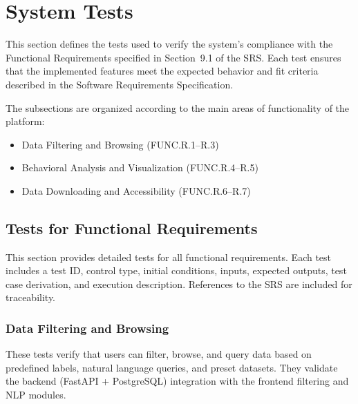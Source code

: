 \documentclass[12pt, titlepage]{article}
\begin{document}


\section{System Tests}

This section defines the tests used to verify the system’s compliance with the
Functional Requirements specified in Section~9.1 of the SRS. Each test ensures
that the implemented features meet the expected behavior and fit criteria
described in the Software Requirements Specification. 

The subsections are organized according to the main areas of functionality of
the platform:
\begin{itemize}
    \item Data Filtering and Browsing (FUNC.R.1--R.3)
    \item Behavioral Analysis and Visualization (FUNC.R.4--R.5)
    \item Data Downloading and Accessibility (FUNC.R.6--R.7)
\end{itemize}

\subsection{Tests for Functional Requirements}

This section provides detailed tests for all functional requirements. Each test
includes a test ID, control type, initial conditions, inputs, expected outputs,
test case derivation, and execution description. References to the SRS are
included for traceability. 

\subsubsection{Data Filtering and Browsing}

These tests verify that users can filter, browse, and query data based on
predefined labels, natural language queries, and preset datasets. They validate
the backend (FastAPI + PostgreSQL) integration with the frontend filtering and
NLP modules.
\end{document}

